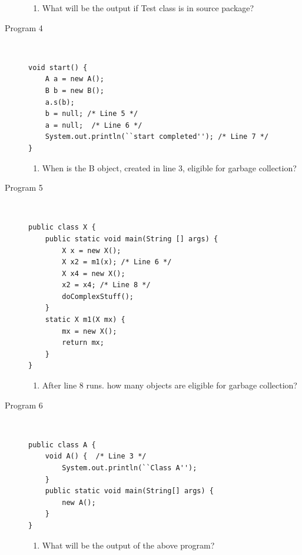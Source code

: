 \documentclass[11pt,a4paper]{article}
\def\AnswerBox{\fbox{\begin{minipage}{4in}\hfill\vspace{0.5in}\end{minipage}}}
\begin{document}
\begin{description}
\AnswerBox

\begin{enumerate}[label=\bfseries Q\arabic*:]\itemsep10pt
        \item What will be the output if Test class is in source package?
    \end{enumerate}

\item [Program 4] \
    \begin{lstlisting}
void start() {  
    A a = new A(); 
    B b = new B(); 
    a.s(b);  
    b = null; /* Line 5 */
    a = null;  /* Line 6 */
    System.out.println(``start completed''); /* Line 7 */
} 
\end{lstlisting}

\AnswerBox

\begin{enumerate}[label=\bfseries Q\arabic*:]\itemsep10pt
 \item When is the B object, created in line 3, eligible for garbage collection?
\end{enumerate}


\item [Program 5] \
    \begin{lstlisting}
public class X {
    public static void main(String [] args) {
        X x = new X();
        X x2 = m1(x); /* Line 6 */
        X x4 = new X();
        x2 = x4; /* Line 8 */
        doComplexStuff();
    }
    static X m1(X mx) {
        mx = new X();
        return mx;
    }
}
\end{lstlisting}

\AnswerBox

\begin{enumerate}[label=\bfseries Q\arabic*:]\itemsep10pt
\item After line 8 runs. how many objects are eligible for garbage collection?
         \end{enumerate}


\item [Program 6] \
    \begin{lstlisting}
public class A { 
    void A() {  /* Line 3 */
        System.out.println(``Class A''); 
    } 
    public static void main(String[] args) { 
        new A(); 
    } 
}
\end{lstlisting}

\AnswerBox

\begin{enumerate}[label=\bfseries Q\arabic*:]\itemsep10pt
 \item What will be the output of the above program?
 \end{enumerate}


\end{description}
\end{document}

